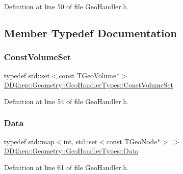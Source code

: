 Definition at line 50 of file Geo\+Handler.\+h.



\subsection{Member Typedef Documentation}
\hypertarget{class_d_d4hep_1_1_geometry_1_1_geo_handler_types_ae294545274767eb8cf886a303033b351}{}\label{class_d_d4hep_1_1_geometry_1_1_geo_handler_types_ae294545274767eb8cf886a303033b351} 
\subsubsection{\texorpdfstring{Const\+Volume\+Set}{ConstVolumeSet}}
{\footnotesize\ttfamily typedef std\+::set$<$const T\+Geo\+Volume$\ast$$>$ \hyperlink{class_d_d4hep_1_1_geometry_1_1_geo_handler_types_ae294545274767eb8cf886a303033b351}{D\+D4hep\+::\+Geometry\+::\+Geo\+Handler\+Types\+::\+Const\+Volume\+Set}}



Definition at line 54 of file Geo\+Handler.\+h.

\hypertarget{class_d_d4hep_1_1_geometry_1_1_geo_handler_types_a568935b7e878d3ea9fe97a2ecf33d641}{}\label{class_d_d4hep_1_1_geometry_1_1_geo_handler_types_a568935b7e878d3ea9fe97a2ecf33d641} 
\subsubsection{\texorpdfstring{Data}{Data}}
{\footnotesize\ttfamily typedef std\+::map$<$int, std\+::set$<$const T\+Geo\+Node$\ast$$>$ $>$ \hyperlink{class_d_d4hep_1_1_geometry_1_1_geo_handler_types_a568935b7e878d3ea9fe97a2ecf33d641}{D\+D4hep\+::\+Geometry\+::\+Geo\+Handler\+Types\+::\+Data}}



Definition at line 61 of file Geo\+Handler.\+h.

\hypertarget{class_d_d4hep_1_1_geometry_1_1_geo_handler_types_a960cd930e1a491fc9a6afa5058865b4e}{}\label{class_d_d4hep_1_1_geometry_1_1_geo_handler_types_a960cd930e1a491fc9a6afa5058865b4e} 
